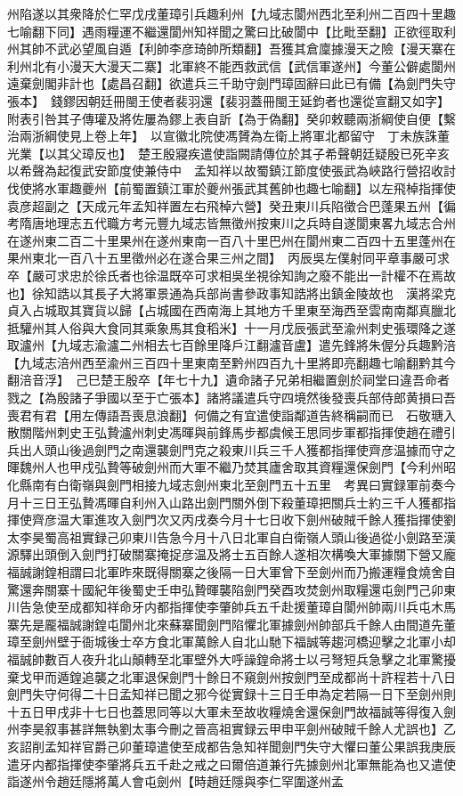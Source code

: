 州陷遂以其衆降於仁罕戊戌董璋引兵趣利州【九域志閬州西北至利州二百四十里趣七喻翻下同】遇雨糧運不繼還閬州知祥聞之驚曰比破閬中【比毗至翻】正欲徑取利州其帥不武必望風自遁【利帥李彦琦帥所類翻】吾獲其倉廩據漫天之險【漫天寨在利州北有小漫天大漫天二寨】北軍終不能西救武信【武信軍遂州】今董公僻處閬州遠棄劍閣非計也【處昌召翻】欲遣兵三千助守劍門璋固辭曰此已有備【為劍門失守張本】　錢鏐因朝廷冊閩王使者裴羽還【裴羽蓋冊閩王延鈞者也還從宣翻又如字】附表引咎其子傳瓘及將佐屢為鏐上表自訢【為于偽翻】癸卯敕聽兩浙綱使自便【繫治兩浙綱使見上卷上年】　以宣徽北院使馮贇為左衛上將軍北都留守　丁未族誅董光業【以其父璋反也】　楚王殷寢疾遣使詣闕請傳位於其子希聲朝廷疑殷已死辛亥以希聲為起復武安節度使兼侍中　孟知祥以故蜀鎮江節度使張武為峽路行營招收討伐使將水軍趣夔州【前蜀置鎮江軍於夔州張武其舊帥也趣七喻翻】以左飛棹指揮使袁彦超副之【天成元年孟知祥置左右飛棹六營】癸丑東川兵陷徵合巴蓬果五州【徧考隋唐地理志五代職方考元豐九域志皆無徵州按東川之兵時自遂閬東畧九域志合州在遂州東二百二十里果州在遂州東南一百八十里巴州在閬州東二百四十五里蓬州在果州東北一百八十五里徵州必在遂合果三州之間】　丙辰吳左僕射同平章事嚴可求卒【嚴可求忠於徐氏者也徐温既卒可求相吳坐視徐知詢之廢不能出一計權不在焉故也】徐知誥以其長子大將軍景通為兵部尚書參政事知誥將出鎮金陵故也　漢將梁克貞入占城取其寶貨以歸【占城國在西南海上其地方千里東至海西至雲南南鄰真臘北抵驩州其人俗與大食同其乘象馬其食稻米】十一月戊辰張武至渝州刺史張環降之遂取瀘州【九域志渝瀘二州相去七百餘里降戶江翻瀘音盧】遣先鋒將朱偓分兵趣黔涪【九域志涪州西至渝州三百四十里東南至黔州四百九十里將即亮翻趣七喻翻黔其今翻涪音浮】　己巳楚王殷卒【年七十九】遺命諸子兄弟相繼置劍於祠堂曰違吾命者戮之【為殷諸子爭國以至于亡張本】諸將議遣兵守四境然後發喪兵部侍郎黄損曰吾喪君有君【用左傳語吾喪息浪翻】何備之有宜遣使詣鄰道告終稱嗣而已　石敬瑭入散關階州刺史王弘贄瀘州刺史馮暉與前鋒馬步都虞候王思同步軍都指揮使趙在禮引兵出人頭山後過劍門之南還襲劍門克之殺東川兵三千人獲都指揮使齊彦温據而守之暉魏州人也甲戍弘贄等破劍州而大軍不繼乃焚其廬舍取其資糧還保劍門【今利州昭化縣南有白衛嶺與劍門相接九域志劍州東北至劍門五十五里　考異曰實録軍前奏今月十三日王弘贄馮暉自利州入山路出劍門關外倒下殺董璋把關兵士約三千人獲都指揮使齊彦温大軍進攻入劍門次又丙戌奏今月十七日收下劍州破賊千餘人獲指揮使劉太李昊蜀高祖實録己卯東川告急今月十八日北軍自白衛嶺人頭山後過從小劍路至漢源驛出頭倒入劍門打破關寨掩捉彦温及將士五百餘人遂相次構喚大軍據關下營又龐福誠謝鍠相謂曰北軍昨來既得關寨之後隔一日大軍曾下至劍州而乃搬運糧食燒舍自驚還奔關寨十國紀年後蜀史壬申弘贄暉襲陷劍門癸酉攻焚劍州取糧還屯劍門己卯東川告急使至成都知祥命牙内都指揮使李肇帥兵五千赴援董璋自閬州帥兩川兵屯木馬寨先是龎福誠謝鍠屯閬州北來蘇寨聞劍門陷懼北軍據劍州帥部兵千餘人由間道先董璋至劍州壁于衙城後士卒方食北軍萬餘人自北山馳下福誠等趨河橋迎擊之北軍小却福誠帥數百人夜升北山顛轉至北軍壁外大呼譟鍠命將士以弓弩短兵急擊之北軍驚擾棄戈甲而遁鍠追襲之北軍退保劍門十餘日不窺劍州按劍門至成都尚十許程若十八日劍門失守何得二十日孟知祥已聞之邪今從實録十三日壬申為定若隔一日下至劍州則十五日甲戌非十七日也蓋思同等以大軍未至故收糧燒舍還保劍門故福誠等得復入劍州李昊叙事甚詳無執劉太事今刪之晉高祖實録云甲申平劍州破賊千餘人尤誤也】乙亥詔削孟知祥官爵己卯董璋遣使至成都告急知祥聞劍門失守大懼曰董公果誤我庚辰遣牙内都指揮使李肇將兵五千赴之戒之曰爾倍道兼行先據劍州北軍無能為也又遣使詣遂州令趙廷隱將萬人會屯劍州【時趙廷隱與李仁罕圍遂州孟